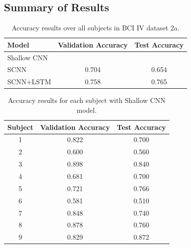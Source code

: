 \documentclass{article}
\begin{document}
\subsection{Summary of Results}
\begin{table}[H]
\begin{center}
    \begin{tabular}{|l|c|c|}
        \hline
        Model           & Validation Accuracy & Test Accuracy   \\
        \hline\hline
        Shallow CNN     &                     &                 \\
        SCNN            & 0.704               & 0.654           \\
        SCNN+LSTM       & 0.758               & 0.765           \\
        \hline
    \end{tabular}
\end{center}
\caption{Accuracy results over all subjects in BCI IV dataset 2a.}
\label{tab:acc}
\end{table}

\begin{table}[H]
\begin{center}
    \begin{tabular}{|c|c|c|}
        \hline
        Subject & Validation Accuracy   & Test Accuracy \\
        \hline\hline
        1       & 0.822  & 0.700    \\
        2       & 0.600  & 0.560    \\
        3       & 0.898  & 0.840    \\
        4       & 0.681  & 0.700    \\
        5       & 0.721  & 0.766    \\
        6       & 0.581  & 0.510    \\
        7       & 0.848  & 0.740    \\
        8       & 0.878  & 0.760    \\
        9       & 0.829  & 0.872    \\
        \hline
    \end{tabular}
\end{center}
\caption{Accuracy results for each subject with Shallow CNN model.}
\label{tab:subj}
\end{table}
\end{document}
